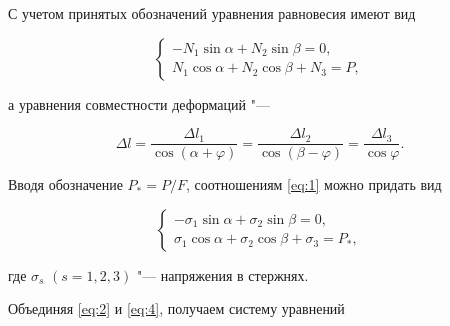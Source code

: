С учетом принятых обозначений уравнения равновесия имеют вид \vspace{-2mm}

\begin{equation}

\label{eq:1}

\begin{cases}

-N_1 \sin{\alpha} + N_2 \sin{\beta} = 0,\\

N_1 \cos{\alpha} + N_2 \cos{\beta} + N_3 = P,

\end{cases}

\end{equation}

а уравнения совместности деформаций "--- \vspace{-2mm}

\begin{equation}

\label{eq:2}

\Delta l = \frac{\Delta l_1}{\cos{(\alpha+\varphi)}} = \frac{\Delta l_2}{\cos{(\beta-\varphi)}} = \frac{\Delta l_3}{\cos{\varphi}}.

\end{equation}



Вводя обозначение $P_\ast = P / F$, соотношениям \eqref{eq:1} можно придать вид

\begin{equation}

\label{eq:3}

\begin{cases}

-\sigma_1 \sin{\alpha} + \sigma_2 \sin{\beta} = 0,\\

\sigma_1 \cos{\alpha} + \sigma_2 \cos{\beta} + \sigma_3 = P_\ast,

\end{cases}

\end{equation}

где $\sigma_s$ $(s=1,2,3)$ "--- напряжения в стержнях.



Объединяя \eqref{eq:2} и \eqref{eq:4}, получаем систему уравнений

